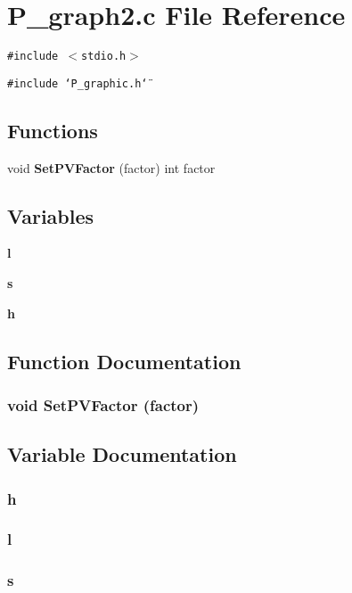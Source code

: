 \section{P\_\-graph2.c File Reference}
\label{P__graph2_8c}
{\tt \#include $<$stdio.h$>$}\par
{\tt \#include \char`\"{}P\_\-graphic.h\char`\"{}}\par
\subsection*{Functions}
\begin{CompactItemize}
\item 
void {\bf Set\-PVFactor} (factor) int factor
\end{CompactItemize}
\subsection*{Variables}
\begin{CompactItemize}
\item 
{\bf l}
\item 
{\bf s}
\item 
{\bf h}
\end{CompactItemize}


\subsection{Function Documentation}
\subsubsection{\setlength{\rightskip}{0pt plus 5cm}void Set\-PVFactor (factor)}\label{P__graph2_8c_a3}




\subsection{Variable Documentation}
\subsubsection{\setlength{\rightskip}{0pt plus 5cm}h}\label{P__graph2_8c_a2}


\subsubsection{\setlength{\rightskip}{0pt plus 5cm}l}\label{P__graph2_8c_a0}


\subsubsection{\setlength{\rightskip}{0pt plus 5cm}s}\label{P__graph2_8c_a1}


